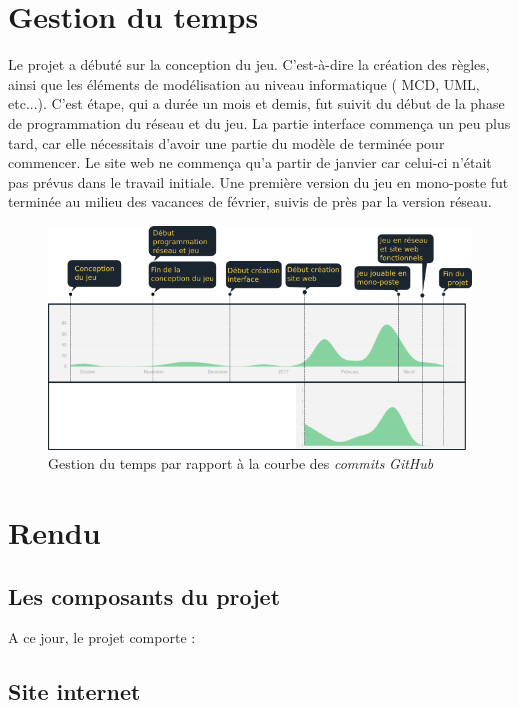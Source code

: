 \documentclass[a4paper,11pt]{report}
\begin{document}
  \section{Gestion du temps}
    Le projet a débuté sur la conception du jeu. C'est-à-dire la création des règles, ainsi que les éléments de modélisation au niveau informatique ( MCD, UML, etc...).  C'est étape, qui a durée un mois et demis, fut suivit du début de la phase de programmation du réseau et du jeu. La partie interface commença un peu plus tard, car elle nécessitais d'avoir une partie du modèle de terminée pour commencer. Le site web ne commença qu'a partir de janvier car celui-ci n'était pas prévus dans le travail initiale. Une première version du jeu en mono-poste fut terminée au milieu des vacances de février, suivis de près par la version réseau.
    \begin{figure}[th]
      \begin{center}
        \includegraphics[scale=0.5]{Assets/gestionTemps.png}
        \caption{Gestion du temps par rapport à la courbe des \textit{commits} \textit{GitHub}}
        \label{RepTime}
      \end{center}
    \end{figure}
  

    \section{Rendu}
      \subsection{Les composants du projet}
        A ce jour, le projet comporte :

 	\subsection{Site internet}
\end{document}
